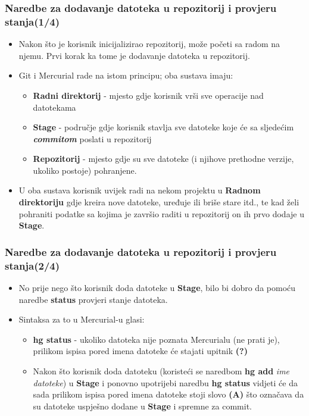 \documentclass{beamer}
\begin{document}
	\begin{frame}
		\frametitle{Naredbe za dodavanje datoteka u repozitorij i provjeru stanja(1/4)}
		 \begin{itemize}
			  \item Nakon što je korisnik inicijalizirao repozitorij, može početi sa radom na njemu. Prvi korak ka tome je dodavanje datoteka u repozitorij.
			  \item Git i Mercurial rade na istom principu; oba sustava imaju:
				  \begin{itemize}
					  \item \textbf{Radni direktorij} - mjesto gdje korisnik vrši sve operacije nad datotekama
					  \item \textbf{Stage} - područje gdje korisnik stavlja sve datoteke koje će sa sljedećim \textbf{\textit{commitom}} poslati u repozitorij
					  \item \textbf{Repozitorij} - mjesto gdje su sve datoteke (i njihove prethodne verzije, ukoliko postoje) pohranjene.
				  \end{itemize}
			\item U oba sustava korisnik uvijek radi na nekom projektu u \textbf{Radnom direktoriju} gdje kreira nove datoteke, uređuje ili briše stare itd., te kad želi pohraniti podatke sa kojima je završio raditi u repozitorij on ih prvo dodaje u \textbf{Stage}.
		  \end{itemize}
	\end{frame}

	\begin{frame}
		\frametitle{Naredbe za dodavanje datoteka u repozitorij i provjeru stanja(2/4)}
 		\begin{itemize}
  		  	\item No prije nego što korisnik doda datoteke u \textbf{Stage}, bilo bi dobro da pomoću naredbe \textbf{status} provjeri stanje datoteka.
			\item Sintaksa za to u Mercurial-u glasi:
			\begin{itemize}
				\item \textbf{hg status} - ukoliko datoteka nije poznata Mercurialu (ne prati je), prilikom ispisa pored imena datoteke će stajati upitnik \textbf{(?)}
				\item Nakon što korisnik doda datoteku (koristeći se naredbom \textbf{hg add} \textit{ime datoteke}) u \textbf{Stage} i ponovno upotrijebi naredbu \textbf{hg status} vidjeti će da sada prilikom ispisa pored imena datoteke stoji slovo \textbf{(A)} što označava da su datoteke uspješno dodane u \textbf{Stage} i spremne za commit.
			\end{itemize}
		\end{itemize}
	\end{frame}
\end{document}
